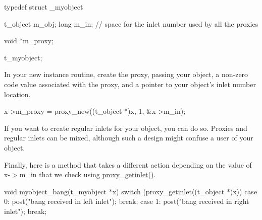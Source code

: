 \begin{DoxyCode}
    typedef struct _myobject
    {
        t_object m_obj;
        long m_in;          // space for the inlet number used by all the proxies
      
        void *m_proxy;
    } t_myobject;
\end{DoxyCode}


In your new instance routine, create the proxy, passing your object, a non-\/zero code value associated with the proxy, and a pointer to your object's inlet number location.


\begin{DoxyCode}
        x->m_proxy = proxy_new((t_object *)x, 1, &x->m_in);
\end{DoxyCode}


If you want to create regular inlets for your object, you can do so. Proxies and regular inlets can be mixed, although such a design might confuse a user of your object.

Finally, here is a method that takes a different action depending on the value of x-\/$>$m\_\-in that we check using \hyperlink{group__inout_gae81f89a78389587dc23d641e38b42481}{proxy\_\-getinlet()}.


\begin{DoxyCode}
     void myobject_bang(t_myobject *x)
    {
        switch (proxy_getinlet((t_object *)x)) {
            case 0:
                post("bang received in left inlet");
                break;
            case 1:
                post("bang received in right inlet");
                break;
        }
    }
\end{DoxyCode}
 
